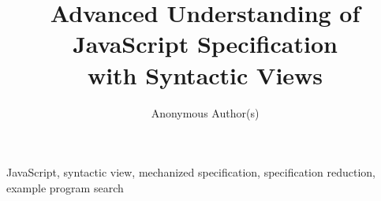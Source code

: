 \documentclass[10pt,conference]{IEEEtran}
\begin{document}
\title{Advanced Understanding of JavaScript Specification\\
with Syntactic Views}

\author{Anonymous Author(s)}

%
%
%
%
%
%

\maketitle



\begin{IEEEkeywords}
JavaScript,
syntactic view,
mechanized specification,
specification reduction,
example program search
\end{IEEEkeywords}











\balance

\end{document}
